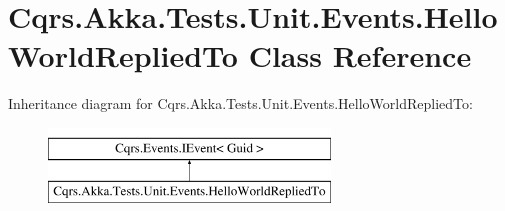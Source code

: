 \hypertarget{classCqrs_1_1Akka_1_1Tests_1_1Unit_1_1Events_1_1HelloWorldRepliedTo}{}\section{Cqrs.\+Akka.\+Tests.\+Unit.\+Events.\+Hello\+World\+Replied\+To Class Reference}
\label{classCqrs_1_1Akka_1_1Tests_1_1Unit_1_1Events_1_1HelloWorldRepliedTo}
Inheritance diagram for Cqrs.\+Akka.\+Tests.\+Unit.\+Events.\+Hello\+World\+Replied\+To\+:\begin{figure}[H]
\begin{center}
\leavevmode
\includegraphics[height=2.000000cm]{classCqrs_1_1Akka_1_1Tests_1_1Unit_1_1Events_1_1HelloWorldRepliedTo}
\end{center}
\end{figure}
